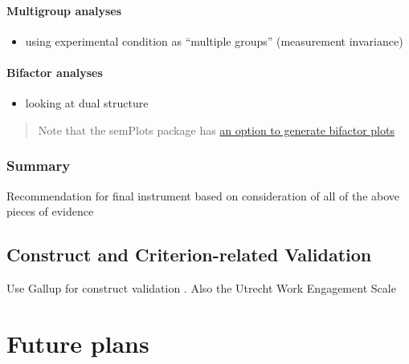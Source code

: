 \documentclass[
]{book}
\providecommand{\tightlist}{%
  \setlength{\itemsep}{0pt}\setlength{\parskip}{0pt}}
\begin{document}
\hypertarget{multigroup-analyses}{%
\subsubsection{Multigroup analyses}\label{multigroup-analyses}}

\begin{itemize}
\tightlist
\item
  using experimental condition as ``multiple groups'' (measurement invariance)
\end{itemize}

\hypertarget{bifactor-analyses}{%
\subsubsection{Bifactor analyses}\label{bifactor-analyses}}

\begin{itemize}
\tightlist
\item
  looking at dual structure
\end{itemize}

\begin{quote}
Note that the semPlots package has \href{https://www.rdocumentation.org/packages/semPlot/versions/1.1.2/topics/semPaths}{an option to generate bifactor plots}
\end{quote}

\hypertarget{summary}{%
\subsection{Summary}\label{summary}}

Recommendation for final instrument based on consideration of all of the above pieces of evidence

\hypertarget{construct-and-criterion-related-validation}{%
\section{Construct and Criterion-related Validation}\label{construct-and-criterion-related-validation}}

Use Gallup for construct validation \citep{thackray_gallup_2005, harter_relationship_2013}. Also the Utrecht Work Engagement Scale \citep[UWES;][]{schaufeli_measurement_2002, schaufeli_defining_2010}

\hypertarget{future-plans}{%
\chapter{Future plans}\label{future-plans}}
\end{document}
